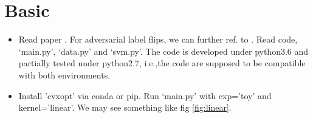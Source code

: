 \documentclass[12pt]{article}
\begin{document}
\section{Basic}
\begin{itemize}
    \item Read paper \cite{biggio2011support}. For adversarial label flips, we can further ref. to \cite{xiao2015support}. Read code, ‘main.py’,
    ‘data.py’ and ‘svm.py’. The code is developed under python3.6 and partially tested under
    python2.7, i.e.,the code are supposed to be compatible with both environments.
    \item Install ’cvxopt’ via conda or pip. Run ‘main.py’ with exp=’toy’ and kernel=’linear’. We may
    see something like fig \ref{fig:linear}. 


\end{itemize}
\end{document}
